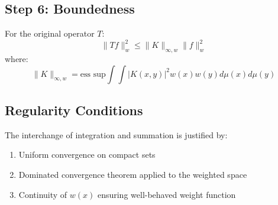 \documentclass{article}
\begin{document}
\subsection{Step 6: Boundedness}

For the original operator $T$:
\[
\|Tf\|^2_w \leq \|K\|_{\infty,w} \|f\|^2_w
\]
where:
\[
\|K\|_{\infty,w} = \text{ess sup} \int\int |K(x,y)|^2w(x)w(y)d\mu(x)d\mu(y)
\]

\subsection{Regularity Conditions}

The interchange of integration and summation is justified by:
\begin{enumerate}
    \item Uniform convergence on compact sets
    \item Dominated convergence theorem applied to the weighted space
    \item Continuity of $w(x)$ ensuring well-behaved weight function
\end{enumerate}
\end{document}
